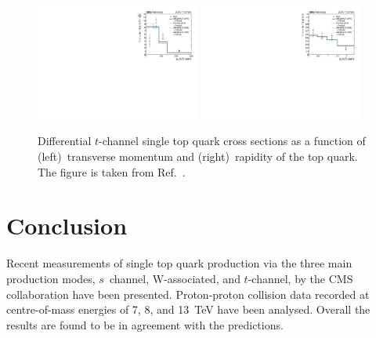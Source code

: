 \documentclass{PoS}
\begin{document}
\begin{figure}[!htb]
\begin{center}
\includegraphics[width=0.48\textwidth]{unfolded_top_pt.pdf}\hspace{0.02\textwidth}
\includegraphics[width=0.48\textwidth]{unfolded_top_y.pdf}
\caption{\label{fig:t-channel-diff}Differential $t$-channel single top quark cross sections as a function of (left)~transverse momentum and (right)~rapidity of the top quark. The figure is taken from Ref.~\cite{tchdiff}.}
\end{center}
\end{figure}

\section{Conclusion}

Recent measurements of single top quark production via the three main production modes, $s$~channel, W-associated, and $t$-channel, by the CMS collaboration have been presented. Proton-proton collision data recorded at centre-of-mass energies of 7, 8, and 13~TeV have been analysed. Overall the results are found to be in agreement with the predictions.
\end{document}
